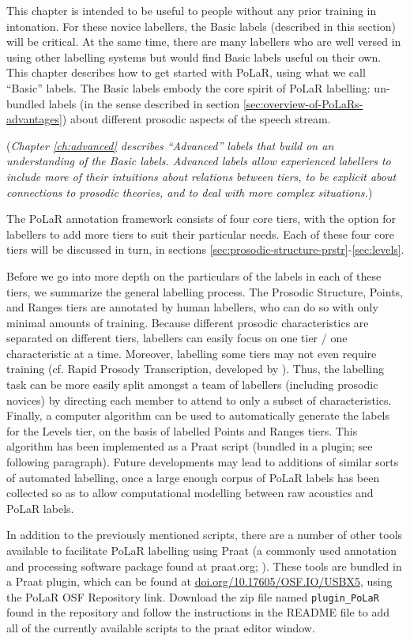\documentclass[11pt, twoside]{memoir}
\begin{document}
This chapter is intended to be useful to people without any prior training in intonation. For these novice labellers, the Basic labels (described in this section) will be critical. At the same time, there are many labellers who are well versed in using other labelling systems but would find Basic labels useful on their own. This chapter describes how to get started with PoLaR, using what we call “Basic” labels. The Basic labels embody the core spirit of PoLaR labelling: un-bundled labels (in the sense described in section \ref{sec:overview-of-PoLaRs-advantages}) about different prosodic aspects of the speech stream.

(\textit{Chapter \ref{ch:advanced} describes “Advanced” labels that build on an understanding of the Basic labels. Advanced labels allow experienced labellers to include more of their intuitions about relations between tiers, to be explicit about connections to prosodic theories, and to deal with more complex situations.})

The PoLaR annotation framework consists of four core tiers, with the option for labellers to add more tiers to suit their particular needs. Each of these four core tiers will be discussed in turn, in sections \ref{sec:prosodic-structure-prstr}-\ref{sec:levels}.

Before we go into more depth on the particulars of the labels in each of these tiers, we summarize the general labelling process. The Prosodic Structure, Points, and Ranges tiers are annotated by human labellers, who can do so with only minimal amounts of training. Because different prosodic characteristics are separated on different tiers, labellers can easily focus on one tier / one characteristic at a time. Moreover, labelling some tiers may not even require training (cf. Rapid Prosody Transcription, developed by \citealt{cole-14}). Thus, the labelling task can be more easily split amongst a team of labellers (including prosodic novices) by directing each member to attend to only a subset of characteristics. Finally, a computer algorithm can be used to automatically generate the labels for the Levels tier, on the basis of labelled Points and Ranges tiers. This algorithm has been implemented as a Praat script (bundled in a plugin; see following paragraph). Future developments may lead to additions of similar sorts of automated labelling, once a large enough corpus of PoLaR labels has been collected so as to allow computational modelling between raw acoustics and PoLaR labels.

In addition to the previously mentioned scripts, there are a number of other tools available to facilitate PoLaR labelling using Praat (a commonly used annotation and processing software package found at praat.org; \citealt{praat}). These tools are bundled in a Praat plugin, which can be found at \href{https://doi.org/10.17605/OSF.IO/USBX5}{\uline{doi.org/10.17605/OSF.IO/USBX5}}, using the PoLaR OSF Repository link. Download the zip file named \texttt{plugin\_PoLaR} found in the repository and follow the instructions in the README file to add all of the currently available scripts to the praat editor window.
\end{document}
